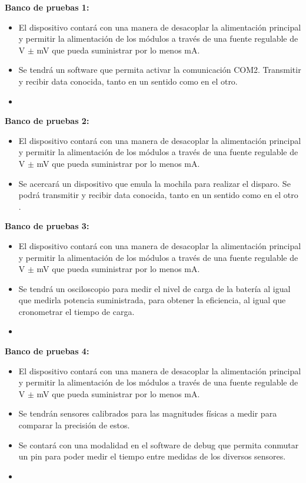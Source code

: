 \textbf{Banco de pruebas 1:}
\begin{itemize}
	\item El dispositivo contará con una manera de desacoplar la alimentación principal y permitir la alimentación de los módulos a través de una fuente regulable de \TBD V $\pm$ \TBD mV que pueda suministrar por lo menos \TBD mA.
	\item Se tendrá un software que permita activar  la comunicación COM2. Transmitir y recibir data conocida, tanto en un sentido como en el otro.
	\item \TBC
\end{itemize}

\textbf{Banco de pruebas 2:}
\begin{itemize}
	\item El dispositivo contará con una manera de desacoplar la alimentación principal y permitir la alimentación de los módulos a través de una fuente regulable de \TBD V $\pm$ \TBD mV que pueda suministrar por lo menos \TBD mA.
	\item Se acercará un dispositivo que emula la mochila para realizar el disparo. Se podrá transmitir y recibir data conocida, tanto en un sentido como en el otro \TBC.
\end{itemize}

\textbf{Banco de pruebas 3:}
\begin{itemize}
	\item El dispositivo contará con una manera de desacoplar la alimentación principal y permitir la alimentación de los módulos a través de una fuente regulable de \TBD V $\pm$ \TBD mV que pueda suministrar por lo menos \TBD mA.
	\item Se tendrá un osciloscopio para medir el nivel de carga de la batería al igual que medirla potencia suministrada, para obtener la eficiencia, al igual que cronometrar el tiempo de carga.
	\item \TBC
\end{itemize}

\textbf{Banco de pruebas 4:}
\begin{itemize}
	\item El dispositivo contará con una manera de desacoplar la alimentación principal y permitir la alimentación de los módulos a través de una fuente regulable de \TBD V $\pm$ \TBD mV que pueda suministrar por lo menos \TBD mA.
	\item Se tendrán sensores calibrados para las magnitudes físicas a medir para comparar la precisión de estos.
	\item Se contará con una modalidad en el software de debug que permita conmutar un pin para poder medir el tiempo entre medidas de los diversos sensores.
	\item \TBC
\end{itemize}

